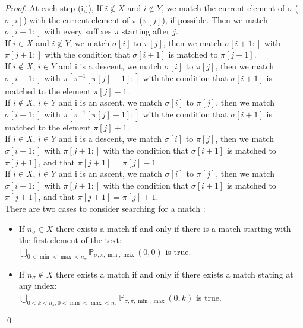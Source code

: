\documentclass[a4paper]{llncs}
\newcommand{\ptext}{\pi}
\newcommand{\pmotif}{\sigma}
\newcommand{\x}{X}
\newcommand{\y}{Y}
\begin{document}
\begin{proof}
			At each step (i,j),
			If $i \notin \x$ and $i \notin \y$,
			we match the current element of $\pmotif$ ($\pmotif[i]$)
			with the current element of $\ptext$ ($\ptext[j]$), if possible.
			Then we match $\pmotif[i+1:]$ with 
			every suffixes $\ptext$ starting after $j$.\\
			
			If $i \in \x$ and $i \notin \y$,
			we match $\pmotif[i]$ to $\ptext[j]$, 
			then we match $\pmotif[i+1:]$ with $\ptext[j+1:]$
			with the condition that
			$\pmotif[i+1]$ is matched to $\ptext[j+1]$.\\
			
			If $i \notin \x$, $i \in \y$ and i is a descent,
			we match $\pmotif[i]$ to $\ptext[j]$, 
			then we match $\pmotif[i+1:]$ 
			with $\ptext[\ptext^{-1}[\ptext[j]-1]:]$
			with the condition that
			$\pmotif[i+1]$ is matched to the element $\ptext[j]-1$.\\						
			
			If $i \notin \x$, $i \in \y$ and i is an ascent,
			we match $\pmotif[i]$ to $\ptext[j]$, 
			then we match $\pmotif[i+1:]$ 
			with $\ptext[\ptext^{-1}[\ptext[j]+1]:]$
			with the condition that
			$\pmotif[i+1]$ is matched to the element $\ptext[j]+1$.\\	

			If $i \in \x$, $i \in \y$ and i is a descent,
			we match $\pmotif[i]$ to $\ptext[j]$, 
			then we match $\pmotif[i+1:]$ with $\ptext[j+1:]$
			with the condition that
			$\pmotif[i+1]$ is matched to $\ptext[j+1]$,
			and that $\ptext[j+1]=\ptext[j]-1$.\\			

			If $i \in \x$, $i \in \y$ and i is an ascent,
			we match $\pmotif[i]$ to $\ptext[j]$, 
			then we match $\pmotif[i+1:]$ with $\ptext[j+1:]$
			with the condition that
			$\pmotif[i+1]$ is matched to $\ptext[j+1]$,
			and that $\ptext[j+1]=\ptext[j]+1$.\\		
					
			There are two cases to consider searching for a match :
			\begin{itemize}
				\item If $n_\pmotif \in \x$ there exists a match if and only if there is a match starting with the first element of the text:\\ $\bigcup_{0<\min<\max<n_\ptext}\mathbb{P}_{\pmotif,\ptext,\min,\max}(0,0)$ is true.
				\item If $n_\pmotif \notin \x$ there exists a match if and only if there exists a match stating at any index: \\	$\bigcup_{0<k<n_\ptext,0<\min<\max<n_\ptext}\mathbb{P}_{\pmotif,\ptext,\min,\max}(0,k)$
							is true.	
			\end{itemize}

			
			\qed
			\end{proof}
			
\end{document}
